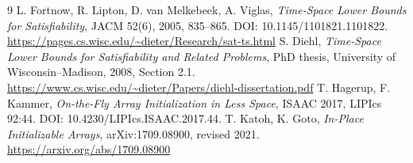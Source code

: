 \documentclass[11pt]{article}
\begin{document}
\begin{thebibliography}{9}
 L. Fortnow, R. Lipton, D. van Melkebeek, A. Viglas,
\emph{Time-Space Lower Bounds for Satisfiability}, JACM 52(6), 2005,
835--865. DOI: 10.1145/1101821.1101822.
\url{https://pages.cs.wisc.edu/~dieter/Research/sat-ts.html}
 S. Diehl, \emph{Time-Space Lower Bounds for Satisfiability
and Related Problems}, PhD thesis, University of Wisconsin--Madison, 2008,
Section 2.1. \url{https://www.cs.wisc.edu/~dieter/Papers/diehl-dissertation.pdf}
 T. Hagerup, F. Kammer,
\emph{On-the-Fly Array Initialization in Less Space}, ISAAC 2017,
LIPIcs 92:44. DOI: 10.4230/LIPIcs.ISAAC.2017.44.
 T. Katoh, K. Goto,
\emph{In-Place Initializable Arrays}, arXiv:1709.08900, revised 2021.
\url{https://arxiv.org/abs/1709.08900}
\end{thebibliography}
\end{document}

